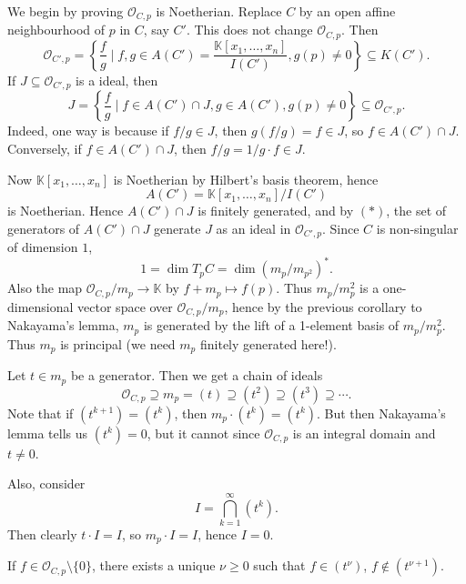 \documentclass[12pt]{article}
\begin{document}
\begin{proofbox}
	We begin by proving $\mathcal{O}_{C, p}$ is Noetherian. Replace $C$ by an open affine neighbourhood of $p$ in $C$, say $C'$. This does not change $\mathcal{O}_{C, p}$. Then
	\[
		\mathcal{O}_{C', p} = \left\{ \frac{f}{g} \mid f, g \in A(C') = \frac{\mathbb{K}[x_1, \ldots, x_n]}{I(C')}, g(p) \neq 0 \right\} \subseteq K(C').
	\]
	If $J \subseteq \mathcal{O}_{C', p}$ is a ideal, then
	\[
		J = \left\{ \frac{f}{g} \mid f \in A(C') \cap J, g \in A(C'), g(p) \neq 0 \right\} \subseteq \mathcal{O}_{C', p}. \tag{$\ast$}
	\]
	Indeed, one way is because if $f/g \in J$, then $g(f/g) = f \in J$, so $f \in A(C') \cap J$. Conversely, if $f \in A(C') \cap J$, then $f/g = 1/g \cdot f \in J$.

	Now $\mathbb{K}[x_1, \ldots, x_n]$ is Noetherian by Hilbert's basis theorem, hence
	\[
		A(C') = \mathbb{K}[x_1, \ldots, x_n] / I(C')
	\]
	is Noetherian. Hence $A(C') \cap J$ is finitely generated, and by $(\ast)$, the set of generators of $A(C') \cap J$ generate $J$ as an ideal in $\mathcal{O}_{C', p}$. Since $C$ is non-singular of dimension $1$,
	\[
	1 = \dim T_p C = \dim(m_p/m_{p^2})^\ast.
	\]
	Also the map $\mathcal{O}_{C, p} / m_p \to \mathbb{K}$ by $f + m_p \mapsto f(p)$. Thus $m_p / m_p^2$ is a one-dimensional vector space over $\mathcal{O}_{C, p} / m_p$, hence by the previous corollary to Nakayama's lemma, $m_p$ is generated by the lift of a 1-element basis of $m_p/m_p^2$. Thus $m_p$ is principal (we need $m_p$ finitely generated here!).
\end{proofbox}

\begin{remark}
	Let $t \in m_p$ be a generator. Then we get a chain of ideals
	\[
	\mathcal{O}_{C, p} \supseteq m_p = (t) \supseteq (t^2) \supseteq (t^3) \supseteq \cdots.
	\]
	Note that if $(t^{k+1}) = (t^k)$, then $m_p \cdot (t^k) = (t^k)$. But then Nakayama's lemma tells us $(t^k) = 0$, but it cannot since $\mathcal{O}_{C, p}$ is an integral domain and $t \neq 0$.

	Also, consider
	\[
	I = \bigcap_{k = 1}^\infty (t^k).
	\]
	Then clearly $t \cdot I = I$, so $m_p \cdot I = I$, hence $I = 0$.
\end{remark}

\begin{corollary}
	If $f \in \mathcal{O}_{C, p} \setminus \{0\}$, there exists a unique $\nu \geq 0$ such that $f \in (t^\nu)$, $f \not \in (t^{\nu + 1})$.
\end{corollary}
\end{document}
